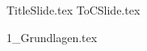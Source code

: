\documentclass[aspectratio=\SetBeamerAspectRatio, 15pt]{beamer}
\begin{document}
{TitleSlide.tex}
{ToCSlide.tex}

{1_Grundlagen.tex}
\end{document}
